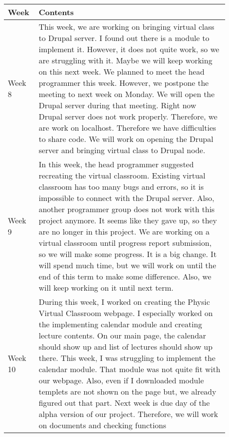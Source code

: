 \documentclass[10pt]{article}
\begin{document}
\begin{center}
        \begin{tabular}{ | p{0.1\linewidth} | p{0.8\linewidth} | } \hline
            Week & Contents  \\ \hline                  
            Week 8 & This week, we are working on bringing virtual class to Drupal server. I found out there is a module to implement it.  However, it does not quite work, so we are struggling with it. Maybe we will keep working on this next week. We planned to meet the head programmer this week. However, we postpone the meeting to next week on Monday. We will open the Drupal server during that meeting. Right now Drupal server does not work properly. Therefore, we are work on localhost. Therefore we have difficulties to share code. We will work on opening the Drupal server and bringing virtual class to Drupal node.   \\ \hline 
            Week 9 & In this week, the head programmer suggested recreating the virtual classroom. Existing virtual classroom has too many bugs and errors, so it is impossible to connect with the Drupal server. Also, another programmer group does not work with this project anymore. It seems like they gave up, so they are no longer in this project. We are working on a virtual classroom until progress report submission, so we will make some progress. It is a big change. It will spend much time, but we will work on until the end of this term to make some difference. Also, we will keep working on it until next term.   \\ \hline
            Week 10 & During this week, I worked on creating the Physic Virtual Classroom webpage. I especially worked on the implementing calendar module and creating lecture contents. On our main page, the calendar should show up and list of lectures should show up there. This week, I was struggling to implement the calendar module. That module was not quite fit with our webpage. Also, even if I downloaded module templets are not shown on the page but, we already figured out that part. Next week is due day of the alpha version of our project. Therefore, we will work on documents and checking functions  \\ \hline
        \end{tabular}
        \end{center}
    
\end{document}
